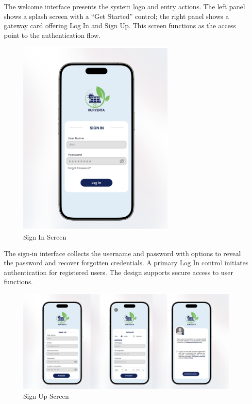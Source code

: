 {  The welcome interface presents the system logo and entry actions. The left panel shows a splash screen with a “Get Started” control; the right panel shows a gateway card offering Log In and Sign Up. This screen functions as the access point to the authentication flow.
  
   \begin{figure}[H]
  	\centering
  	\caption{Sign In Screen}
  	\label{fig:signin}
  	\includegraphics[width=0.7\textwidth]{figures/signin.png}
  \end{figure}
  
  The sign-in interface collects the username and password with options to reveal the password and recover forgotten credentials. A primary Log In control initiates authentication for registered users. The design supports secure access to user functions.
  
   \begin{figure}[H]
  	\centering
  	\caption{Sign Up Screen}
  	\label{fig:signup}
  	\includegraphics[width=1\textwidth]{figures/signup.png}
  \end{figure}
  
}
